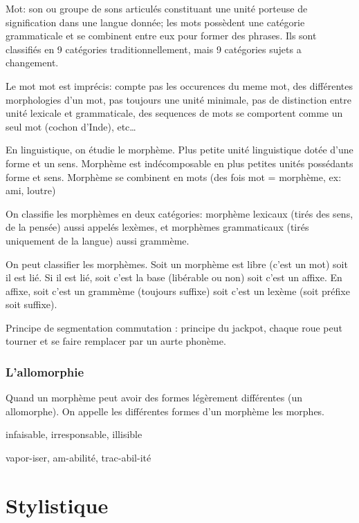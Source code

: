 \documentclass[a4paper]{report}
\theoremstyle{definition}
\theoremstyle{remark}
\begin{document}
Mot: son ou groupe de sons articulés constituant une unité porteuse de signification dans une langue donnée; les mots possèdent une catégorie grammaticale et se combinent entre eux pour former des phrases. Ils sont classifiés en 9 catégories traditionnellement, mais 9 catégories sujets a changement. \par 

Le mot mot est imprécis: compte pas les occurences du meme mot, des différentes morphologies d'un mot, pas toujours une unité minimale, pas de distinction entre unité lexicale et grammaticale, des sequences de mots se comportent comme un seul mot (cochon d'Inde), etc\dots \par

En linguistique, on étudie le morphème. Plus petite unité linguistique dotée d'une forme et un sens. Morphème est indécomposable en plus petites unités possédants forme et sens. Morphème se combinent en mots (des fois mot = morphème, ex: ami, loutre) \par

On classifie les morphèmes en deux catégories: morphème lexicaux (tirés des sens, de la pensée) aussi appelés lexèmes, et morphèmes grammaticaux (tirés uniquement de la langue) aussi grammème. \par 

On peut classifier les morphèmes. Soit un morphème est libre (c'est un mot) soit il est lié. Si il est lié, soit c'est la base (libérable ou non) soit c'est un affixe. En affixe, soit c'est un grammème (toujours suffixe) soit c'est un lexème (soit préfixe soit suffixe). \par

Principe de segmentation commutation : principe du jackpot, chaque roue peut tourner et se faire remplacer par un aurte phonème. 

\subsection{L'allomorphie}

Quand un morphème peut avoir des formes légèrement différentes (un allomorphe). On appelle les différentes formes d'un morphème les morphes. \par

infaisable, irresponsable, illisible \par 

vapor-iser, am-abilité, trac-abil-ité

\chapter{Stylistique}
\end{document}
